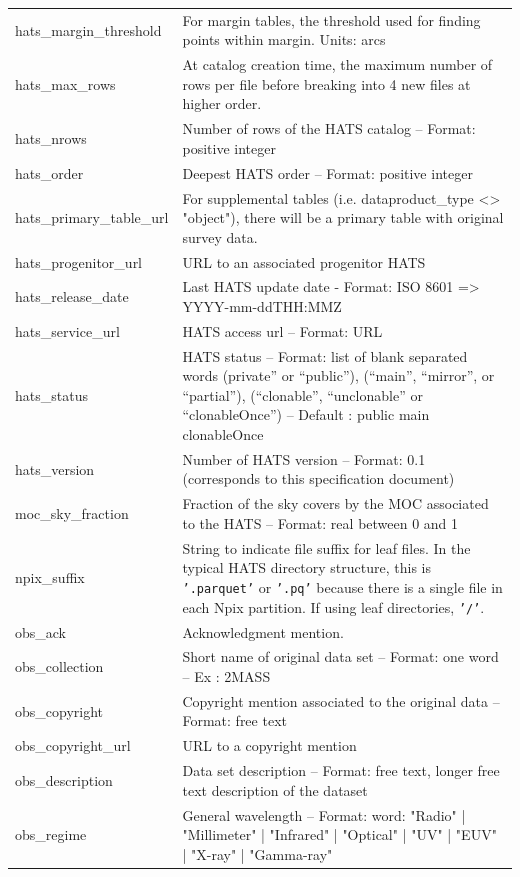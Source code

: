 \documentclass[11pt,a4paper]{ivoa}
\begin{document}
\begin{longtable}[h!]{D{0.33\textwidth} D{0.67\textwidth}}
hats\_margin\_threshold &For margin tables, the threshold used for finding points within margin. Units: arcs \\
hats\_max\_rows &At catalog creation time, the maximum number of rows per file before breaking into 4 new files at higher order. \\
hats\_nrows &Number of rows of the HATS catalog – Format: positive integer \\
hats\_order &Deepest HATS order – Format: positive integer \\
hats\_primary\_table\_url &For supplemental tables (i.e. dataproduct\_type <> "object"), there will be a primary table with original survey data. \\
hats\_progenitor\_url &URL to an associated progenitor HATS \\
hats\_release\_date &Last HATS update date - Format: ISO 8601 => YYYY-mm-ddTHH:MMZ \\
hats\_service\_url &HATS access url – Format: URL \\
hats\_status &HATS status – Format: list of blank separated words (private” or “public”), (“main”, “mirror”, or “partial”), (“clonable”, “unclonable” or “clonableOnce”) – Default : public main clonableOnce \\
hats\_version &Number of HATS version – Format: 0.1 (corresponds to this specification document) \\
moc\_sky\_fraction &Fraction of the sky covers by the MOC associated to the HATS – Format: real between 0 and 1 \\
npix\_suffix & String to indicate file suffix for leaf files. In the typical HATS directory structure, this is \texttt{'.parquet'} or \texttt{'.pq'} because there is a single file in each Npix partition. If using leaf directories, \texttt{'/'}. \\
obs\_ack &Acknowledgment mention. \\
obs\_collection &Short name of original data set – Format: one word – Ex : 2MASS \\
obs\_copyright &Copyright mention associated to the original data – Format: free text \\
obs\_copyright\_url &URL to a copyright mention \\
obs\_description &Data set description – Format: free text, longer free text description of the dataset \\
obs\_regime &General wavelength – Format: word: "Radio" | "Millimeter" | "Infrared" | "Optical" | "UV" | "EUV" | "X-ray" | "Gamma-ray" \\

\end{longtable}
\end{document}
